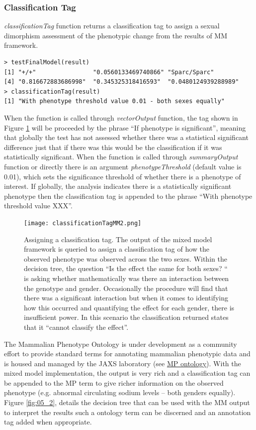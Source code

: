 \documentclass[12pt,a4paper]{article}
\begin{document}
\subsubsection{Classification Tag}
\textit{classificationTag} function returns a classification tag to assign a sexual dimorphism assessment of the phenotypic change from the results of MM framework.
\begingroup
    \fontsize{8pt}{12pt}\selectfont
\begin{verbatim}
> testFinalModel(result)
[1] "+/+"                "0.0560133469740866" "Sparc/Sparc"       
[4] "0.816672883686998"  "0.345325318416593"  "0.0480124939288989"
> classificationTag(result)
[1] "With phenotype threshold value 0.01 - both sexes equally"
\end{verbatim}
\endgroup

When the function is called through \textit{vectorOutput} function,  the tag shown in Figure \ref{fig:05} will be proceeded by the phrase “If phenotype is significant”,  meaning that globally the test has not assessed whether there was a statistical significant difference just that if there was this would be the classification if it was statistically significant.  When the function is called through \textit{summaryOutput} function or directly there is an argument \textit{phenotypeThreshold} (default value is 0.01),  which sets the significance threshold of whether there is a phenotype of interest.  If globally, the analysis indicates there is a statistically significant phenotype then the classification tag is appended to the phrase “With phenotype threshold value XXX”.

\begin{figure}[!tpb]%
\centerline{\texttt{[image: classificationTagMM2.png]}}
\caption{Assigning a classification tag. The output of the mixed model framework is queried to assign a classification tag of how the observed phenotype was observed across the two sexes. Within the decision tree, the question “Is the effect the same for both sexes? “ is asking whether mathematically was there an interaction between the  genotype and gender. Occasionally the procedure will find that there was a significant interaction but when it comes to identifying how this occurred and quantifying the effect for each gender,  there is insufficient power.  In this scenario the classification returned states  that it “cannot classify the effect”.}\label{fig:05}
\end{figure}

The Mammalian Phenotype Ontology is under development as a community effort to provide standard terms for annotating mammalian phenotypic data and is housed and managed by the JAXS laboratory (see \href{http://www.informatics.jax.org/searches/MP_form.shtml}{MP ontology}). With the mixed model implementation, the output is very rich and a classification tag can be appended to the MP term to give richer information on the observed phenotype (e.g. abnormal circulating sodium levels – both genders equally).  Figure \ref{fig:05_2}, details the decision tree that can be used with the MM output to interpret the results such a ontology term can be discerned and an annotation tag added when appropriate.
\end{document}
